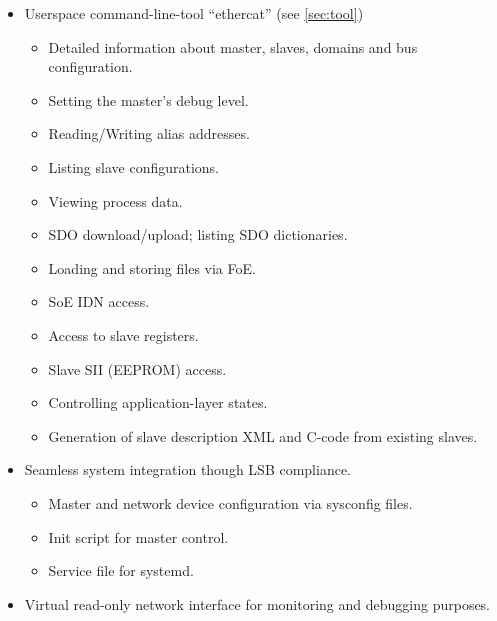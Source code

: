 \documentclass[a4paper,12pt,BCOR=6mm,bibtotoc,idxtotoc]{scrbook}
\begin{document}
\begin{itemize}
\begin{itemize}
  \item Accessing IDNs via the command-line tool.

  \item Accessing IDNs at runtime via the user-space library.

  \end{itemize}

\item Userspace command-line-tool ``ethercat'' (see \autoref{sec:tool})

  \begin{itemize}

  \item Detailed information about master, slaves, domains and bus
  configuration.
  \item Setting the master's debug level.
  \item Reading/Writing alias addresses.
  \item Listing slave configurations.
  \item Viewing process data.
  \item SDO download/upload; listing SDO dictionaries.
  \item Loading and storing files via FoE.
  \item SoE IDN access.
  \item Access to slave registers.
  \item Slave SII (EEPROM) access.
  \item Controlling application-layer states.
  \item Generation of slave description XML and C-code from existing slaves.

  \end{itemize}

\item Seamless system integration though LSB compliance.

  \begin{itemize}

  \item Master and network device configuration via sysconfig files.

  \item Init script for master control.

  \item Service file for systemd.

  \end{itemize}

\item Virtual read-only network interface for monitoring and debugging
  purposes.

\end{itemize}
\end{document}
